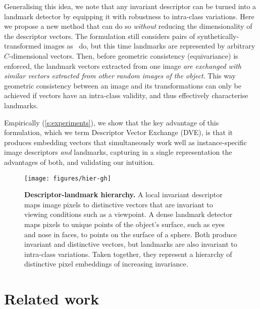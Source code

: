 \documentclass[10pt,twocolumn,letterpaper]{article}
\begin{document}
Generalising this idea, we note that any invariant descriptor can be turned into a landmark detector by equipping it with robustness to intra-class variations.
Here we propose a new method that can do so \emph{without} reducing the dimensionality of the descriptor vectors.
The formulation still considers pairs of synthetically-transformed images as~\cite{thewlis17Bunsupervised} do, but this time landmarks are represented by arbitrary $C$-dimensional vectors.
Then, before geometric consistency (equivariance) is enforced, the landmark vectors extracted from one image \emph{are exchanged with similar vectors extracted from other random images of the object}.
This way geometric consistency between an image and its transformations can only be achieved if vectors have an intra-class validity, and thus effectively characterise landmarks.

Empirically (\cref{s:experiments}), we show that the key advantage of this formulation, which we term Descriptor Vector Exchange (DVE), is that it produces embedding vectors that simultaneously work well as instance-specific image descriptors \emph{and} landmarks, capturing in a single representation the advantages of both, and validating our intuition.

\begin{figure}[t]
\centering\texttt{[image: figures/hier-gh]}
\caption{\textbf{Descriptor-landmark hierarchy.}
A local invariant descriptor maps image pixels to distinctive vectors that are invariant to viewing conditions such as a viewpoint.
A dense landmark detector maps pixels to unique points of the object's surface, such as eyes and nose in faces, to points on the surface of a sphere.
Both produce invariant and distinctive vectors, but landmarks are also invariant to intra-class variations.
Taken together, they represent a hierarchy of distinctive pixel embeddings of increasing invariance.
}\label{f:hier}
\vspace{-0.3cm}
\end{figure}  \section{Related work}\label{s:related}
\end{document}
